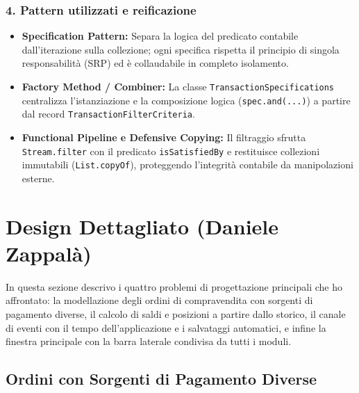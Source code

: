 \documentclass[11pt,a4paper,openright]{report}
\begin{document}
\subsubsection*{4. Pattern utilizzati e reificazione}
\begin{itemize}[noitemsep,topsep=1pt,partopsep=0pt,parsep=0pt]
  \item \textbf{Specification Pattern:} Separa la logica del predicato contabile dall'iterazione sulla collezione; ogni specifica rispetta il principio di singola responsabilità (SRP) ed è collaudabile in completo isolamento.
  \item \textbf{Factory Method / Combiner:} La classe \texttt{TransactionSpecifications} centralizza l'istanziazione e la composizione logica (\texttt{spec.and(...)}) a partire dal record \texttt{TransactionFilter\allowbreak Criteria}.
  \item \textbf{Functional Pipeline e Defensive Copying:} Il filtraggio sfrutta \texttt{Stream.filter} con il predicato \texttt{isSatisfiedBy} e restituisce collezioni immutabili (\texttt{List.copyOf}), proteggendo l'integrità contabile da manipolazioni esterne.
\end{itemize}

\clearpage
\section{Design Dettagliato (Daniele Zappalà)}

In questa sezione descrivo i quattro problemi di progettazione principali che ho affrontato: la modellazione degli ordini di compravendita con sorgenti di pagamento diverse, il calcolo di saldi e posizioni a partire dallo storico, il canale di eventi con il tempo dell'applicazione e i salvataggi automatici, e infine la finestra principale con la barra laterale condivisa da tutti i moduli.

\subsection{Ordini con Sorgenti di Pagamento Diverse}
\end{document}
